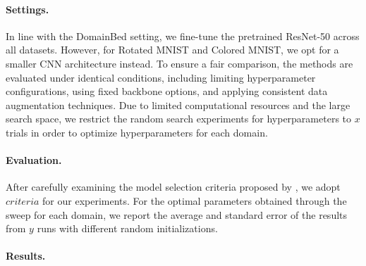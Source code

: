 \paragraph{Settings.} In line with the DomainBed setting, we fine-tune the pretrained ResNet-50 \citep{resnet} across all datasets. However, for Rotated MNIST and Colored MNIST, we opt for a smaller CNN architecture instead. To ensure a fair comparison, the methods are evaluated under identical conditions, including limiting hyperparameter configurations, using fixed backbone options, and applying consistent data augmentation techniques. Due to limited computational resources and the large search space, we restrict the random search experiments for hyperparameters to $x$ trials in order to optimize hyperparameters for each domain. 

\paragraph{Evaluation.} After carefully examining the model selection criteria proposed by \cite{domainbed}, we adopt $criteria$ for our experiments.  For the optimal parameters obtained through the sweep for each domain, we report the average and standard error of the results from $y$ runs with different random initializations.


\paragraph{Results.}




